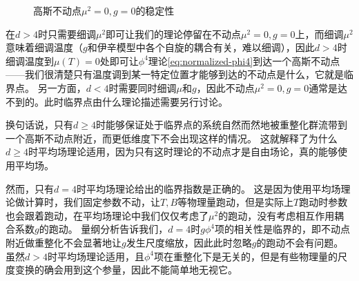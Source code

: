 \documentclass[hyperref, UTF8, a4paper]{ctexart}
\begin{document}
\begin{figure}
    \centering
    \caption{高斯不动点$\mu^2=0, g=0$的稳定性}
    \label{fig:gaussian-stable}
\end{figure}

在$d>4$时只需要细调$\mu^2$即可让我们的理论停留在不动点$\mu^2=0, g=0$上，而细调$\mu^2$意味着细调温度（$g$和伊辛模型中各个自旋的耦合有关，难以细调），因此$d>4$时细调温度到$\mu(T)=0$处即可让$\phi^4$理论\eqref{eq:normalized-phi4}到达一个高斯不动点——我们很清楚只有温度调到某一特定位置才能够到达的不动点是什么，它就是临界点。
另一方面，$d<4$时需要同时细调$\mu$和$g$，因此不动点$\mu^2=0, g=0$通常是达不到的。此时临界点由什么理论描述需要另行讨论。

换句话说，只有$d \geq 4$时能够保证处于临界点的系统自然而然地被重整化群流带到一个高斯不动点附近，而更低维度下不会出现这样的情况。
这就解释了为什么$d \geq 4$时平均场理论适用，因为只有这时理论的不动点才是自由场论，真的能够使用平均场。

然而，只有$d=4$时平均场理论给出的临界指数是正确的。
这是因为使用平均场理论做计算时，我们固定参数不动，让$T, B$等物理量跑动，但是实际上$T$跑动时参数也会跟着跑动，在平均场理论中我们仅仅考虑了$\mu^2$的跑动，没有考虑相互作用耦合系数$g$的跑动。
量纲分析告诉我们，$d=4$时$g\phi^4$项的相关性是临界的，即不动点附近做重整化不会显著地让$g$发生尺度缩放，因此此时忽略$g$的跑动不会有问题。
虽然$d>4$时平均场理论适用，且$\phi^4$项在重整化下是无关的，但是有些物理量的尺度变换的确会用到这个参量，因此不能简单地无视它。
\end{document}
